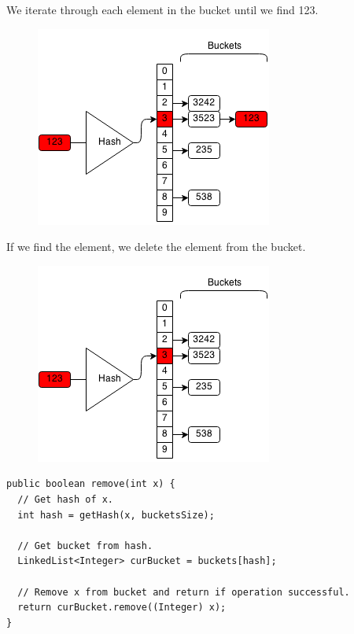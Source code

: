\documentclass[11pt,oneside]{book}
\makeatletter
\def\maxwidth#1{\ifdim\Gin@nat@width>#1 #1\else\Gin@nat@width\fi}
\makeatother
\begin{document}
We iterate through each element in the bucket until we find 123.

\vspace{5px}\begin{figure}[H]\centering
        \includegraphics[width=0.66\maxwidth{\textwidth}]{hashsetrem2.png}
        \end{figure}

If we find the element, we delete the element from the bucket.

\vspace{5px}\begin{figure}[H]\centering
        \includegraphics[width=0.66\maxwidth{\textwidth}]{hashsetrem3.png}
        \end{figure}

\begin{lstlisting}
public boolean remove(int x) {
  // Get hash of x.
  int hash = getHash(x, bucketsSize);
  
  // Get bucket from hash.
  LinkedList<Integer> curBucket = buckets[hash];
  
  // Remove x from bucket and return if operation successful.
  return curBucket.remove((Integer) x);
}
\end{lstlisting}
\end{document}
